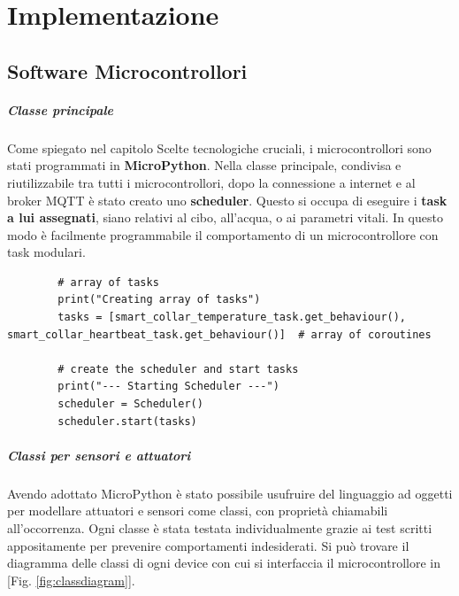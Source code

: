 

\chapter{Implementazione}
\section{Software Microcontrollori}
\paragraph{Classe principale}
Come spiegato nel capitolo Scelte tecnologiche cruciali, i microcontrollori sono stati programmati in \textbf{MicroPython}. Nella classe principale, condivisa e riutilizzabile tra tutti i microcontrollori, dopo la connessione a internet e al broker MQTT è stato creato uno \textbf{scheduler}.  Questo si occupa di eseguire i \textbf{task a lui assegnati}, siano relativi al cibo, all'acqua, o ai parametri vitali. 
In questo modo è facilmente programmabile il comportamento di un microcontrollore con task modulari.
    \begin{lstlisting}
        # array of tasks
        print("Creating array of tasks")
        tasks = [smart_collar_temperature_task.get_behaviour(), smart_collar_heartbeat_task.get_behaviour()]  # array of coroutines
        
        # create the scheduler and start tasks
        print("--- Starting Scheduler ---")
        scheduler = Scheduler()
        scheduler.start(tasks)
    \end{lstlisting}
    

    \paragraph{Classi per sensori e attuatori}
    Avendo adottato MicroPython è stato possibile usufruire del linguaggio ad oggetti per modellare attuatori e sensori come classi, con proprietà chiamabili all'occorrenza. Ogni classe è stata testata individualmente grazie ai test scritti appositamente per prevenire comportamenti indesiderati. Si può trovare il diagramma delle classi di ogni device con cui si interfaccia il microcontrollore in [Fig. \ref{fig:classdiagram}]. 
    
